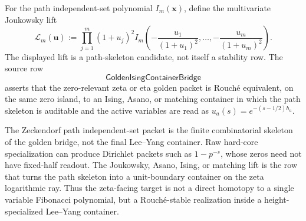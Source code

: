 \begin{definition}
\label{def:rh-multivariate-path-joukowsky-target}
For the path independent-set polynomial $I_m(\mathbf x)$, define the
multivariate Joukowsky lift
$$
\mathcal L_m(\mathbf u)
:=
\prod_{j=1}^{m}(1+u_j)^2
I_m\left(
-\frac{u_1}{(1+u_1)^2},
\ldots,
-\frac{u_m}{(1+u_m)^2}
\right).
$$
The displayed lift is a path-skeleton candidate, not itself a stability
row.  The source row
$$
\mathsf{GoldenIsingContainerBridge}
$$
asserts that the zero-relevant zeta or eta golden packet is Rouch\'e
equivalent, on the same zero island, to an Ising, Asano, or matching
container in which the path skeleton is auditable and the active
variables are read as $u_a(s)=e^{-(s-1/2)h_a}$.
\end{definition}

\begin{principle}
\label{prin:rh-path-hard-core-skeleton}
The Zeckendorf path independent-set packet is the finite combinatorial
skeleton of the golden bridge, not the final Lee--Yang container.  Raw
hard-core specialization can produce Dirichlet packets such as
$1-p^{-s}$, whose zeros need not have fixed-half readout.  The
Joukowsky, Asano, Ising, or matching lift is the row that turns the path
skeleton into a unit-boundary container on the zeta logarithmic ray.
Thus the zeta-facing target is not a direct homotopy to a single
variable Fibonacci polynomial, but a Rouch\'e-stable realization inside a
height-specialized Lee--Yang container.
\end{principle}
